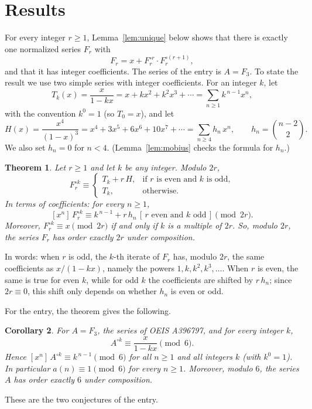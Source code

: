 \documentclass[11pt,a4paper]{article}
\newtheorem{theorem}{Theorem}[section]
\newtheorem{corollary}[theorem]{Corollary}
\theoremstyle{definition}
\theoremstyle{remark}
\newcommand{\coeff}[2]{[x^{#1}]\,#2}
\begin{document}
\section{Results}\label{sec:results}

For every integer $r\ge1$, Lemma~\ref{lem:unique} below shows that there is exactly one normalized series $F_r$ with
\begin{equation}\label{eq:family}
F_r=x+F_r^{\circ r}\cdot F_r^{\circ(r+1)},
\end{equation}
and that it has integer coefficients. The series of the entry is $A=F_{3}$. To state the result we use
two simple series with integer coefficients. For an integer $k$, let
\[
T_k(x)=\frac{x}{1-kx}=x+kx^2+k^2x^3+\cdots=\sum_{n\ge1}k^{\,n-1}x^n ,
\]
with the convention $k^0=1$ (so $T_0=x$), and let
\[
H(x)=\frac{x^4}{(1-x)^3}=x^4+3x^5+6x^6+10x^7+\cdots=\sum_{n\ge4}h_n\,x^n,\qquad h_n=\binom{n-2}{2}.
\]
We also set $h_n=0$ for $n<4$. (Lemma~\ref{lem:mobius} checks the formula for $h_n$.)

\begin{theorem}\label{thm:general}
Let $r\ge1$ and let $k$ be any integer. Modulo $2r$,
\[
F_r^{\circ k}\equiv
\begin{cases}
T_k+r\,H, & \text{if $r$ is even and $k$ is odd},\\
T_k, & \text{otherwise}.
\end{cases}
\]
In terms of coefficients: for every $n\ge1$,
\[
\coeff{n}{F_r^{\circ k}}\equiv k^{\,n-1}+r\,h_n\,[\,r\text{ even and }k\text{ odd}\,]\pmod{2r}.
\]
Moreover, $F_r^{\circ k}\equiv x\pmod{2r}$ if and only if $k$ is a multiple of $2r$. So, modulo $2r$, the series $F_r$
has order exactly $2r$ under composition.
\end{theorem}

In words: when $r$ is odd, the $k$-th iterate of $F_r$ has, modulo $2r$, the same coefficients as $x/(1-kx)$,
namely the powers $1,k,k^2,k^3,\dots$. When $r$ is even, the same is true for even $k$, while for odd $k$ the
coefficients are shifted by $r\,h_n$; since $2r\equiv0$, this shift only depends on whether $h_n$ is even or odd.

For the entry, the theorem gives the following.

\begin{corollary}\label{cor:app}
For $A=F_3$, the series of OEIS A396797, and for every integer $k$,
\[
A^{\circ k}\equiv\frac{x}{1-kx}\pmod6 .
\]
Hence $\coeff{n}{A^{\circ k}}\equiv k^{\,n-1}\pmod6$ for all $n\ge1$ and all integers $k$ (with $k^0=1$). In
particular $a(n)\equiv1\pmod6$ for every $n\ge1$. Moreover, modulo $6$, the series $A$ has order exactly $6$ under
composition.
\end{corollary}
These are the two conjectures of the entry.
\end{document}
